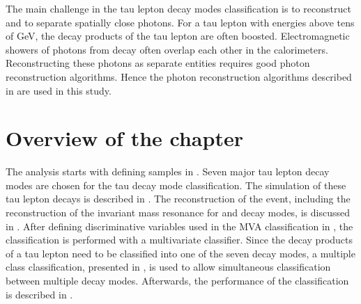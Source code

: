 The main challenge in the tau lepton decay modes  classification is to reconstruct and to separate spatially close photons. For a tau lepton with energies above tens of GeV, the decay products of the tau lepton are often boosted.  Electromagnetic showers of photons from \Ppizero decay often overlap each other in the calorimeters.  Reconstructing these photons as separate entities requires good photon reconstruction algorithms. Hence the photon reconstruction algorithms described in  are used in this study.







%



\section{Overview of the chapter}

The analysis starts with defining samples in . Seven major tau lepton decay modes are chosen for the tau decay mode classification. The simulation of these tau lepton decays is described in .  The reconstruction of the event, including the reconstruction of the invariant mass resonance for \decayRho and \decayAi decay modes, is discussed in .  After defining discriminative variables used in the MVA classification in , the classification is performed with a multivariate classifier. Since the decay products of a tau lepton need to be classified into one of the seven decay modes, a multiple class classification, presented in , is used to allow simultaneous classification between  multiple decay modes. Afterwards, the performance of the classification is described in .

